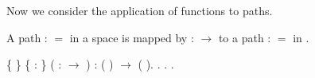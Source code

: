 \documentclass[12pt]{report}
\begin{document}
Now we consider the application of functions to paths. \begin{coqdoccode}
\coqdocemptyline
\end{coqdoccode}
A path  :  $=$  in a space  is mapped by  :  \ensuremath{\rightarrow}  to a
   path    :   $=$   in . \begin{coqdoccode}
\coqdocemptyline
\coqdocnoindent
{}  \{ \} \{  : \} ( :  \ensuremath{\rightarrow} ) : (  ) \ensuremath{\rightarrow} (    ).\coqdoceol
\coqdocnoindent
{}.\coqdoceol
\coqdocindent{1.00em}
.\coqdoceol
\coqdocnoindent
{}.\coqdoceol
\coqdocemptyline
\end{coqdoccode}
\end{document}
